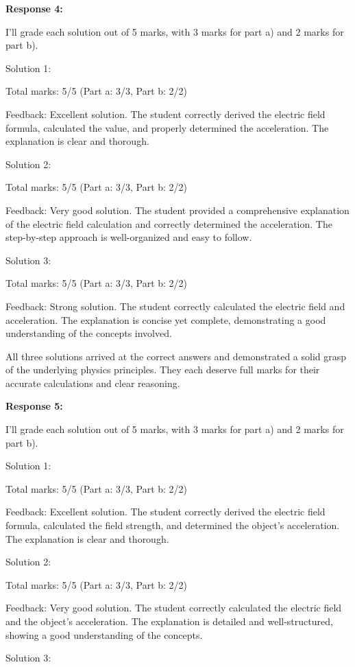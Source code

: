 \documentclass[a4paper,11pt]{article}
\begin{document}
\bigskip
\textbf{Response 4:}

I'll grade each solution out of 5 marks, with 3 marks for part a) and 2 marks for part b).

Solution 1:

Total marks: 5/5 (Part a: 3/3, Part b: 2/2)

Feedback: Excellent solution. The student correctly derived the electric field formula, calculated the value, and properly determined the acceleration. The explanation is clear and thorough.

Solution 2:

Total marks: 5/5 (Part a: 3/3, Part b: 2/2)

Feedback: Very good solution. The student provided a comprehensive explanation of the electric field calculation and correctly determined the acceleration. The step-by-step approach is well-organized and easy to follow.

Solution 3:

Total marks: 5/5 (Part a: 3/3, Part b: 2/2)

Feedback: Strong solution. The student correctly calculated the electric field and acceleration. The explanation is concise yet complete, demonstrating a good understanding of the concepts involved.

All three solutions arrived at the correct answers and demonstrated a solid grasp of the underlying physics principles. They each deserve full marks for their accurate calculations and clear reasoning.

\bigskip
\textbf{Response 5:}

I'll grade each solution out of 5 marks, with 3 marks for part a) and 2 marks for part b).

Solution 1:

Total marks: 5/5 (Part a: 3/3, Part b: 2/2)

Feedback: Excellent solution. The student correctly derived the electric field formula, calculated the field strength, and determined the object's acceleration. The explanation is clear and thorough.

Solution 2:

Total marks: 5/5 (Part a: 3/3, Part b: 2/2)

Feedback: Very good solution. The student correctly calculated the electric field and the object's acceleration. The explanation is detailed and well-structured, showing a good understanding of the concepts.

Solution 3:
\end{document}
